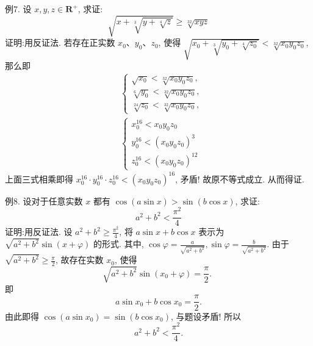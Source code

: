 例7. 设 $x, y, z \in \mathbf{R}^{+}$, 求证:
$$
\sqrt{x+\sqrt[3]{y+\sqrt[4]{z}}} \geqslant \sqrt[32]{x y z}
$$
证明:用反证法.
若存在正实数 $x_0 、 y_0 、 z_0$, 使得 $\sqrt{x_0+\sqrt[3]{y_0+\sqrt[4]{z_0}}}<\sqrt[32]{x_0 y_0 z_0}$, 那么即
$$
\begin{aligned}
& \left\{\begin{array}{l}
\sqrt{x_0}<\sqrt[32]{x_0 y_0 z_0}, \\
\sqrt[6]{y_0}<\sqrt[32]{x_0 y_0 z_0}, \\
\sqrt[24]{z_0}<\sqrt[32]{x_0 y_0 z_0},
\end{array}\right. \\
& \left\{\begin{array}{l}
x_0^{16}<x_0 y_0 z_0 \\
y_0^{16}<\left(x_0 y_0 z_0\right)^3 \\
z_0^{16}<\left(x_0 y_0 z_0\right)^{12}
\end{array}\right.
\end{aligned}
$$
上面三式相乘即得 $x_0^{16} \cdot y_0^{16} \cdot z_0^{16}<\left(x_0 y_0 z_0\right)^{16}$, 矛盾! 故原不等式成立.
从而得证.



例8. 设对于任意实数 $x$ 都有 $\cos (a \sin x)>\sin (b \cos x)$, 求证:
$$
a^2+b^2<\frac{\pi^2}{4}
$$
证明:用反证法.
设 $a^2+b^2 \geqslant \frac{\pi^2}{4}$, 将 $a \sin x+b \cos x$ 表示为 $\sqrt{a^2+b^2} \sin (x+ \varphi)$ 的形式.
其中, $\cos \varphi=\frac{a}{\sqrt{a^2+b^2}}, \sin \varphi=\frac{b}{\sqrt{a^2+b^2}}$.
由于 $\sqrt{a^2+b^2} \geqslant \frac{\pi}{2}$, 故存在实数 $x_0$, 使得
$$
\sqrt{a^2+b^2} \sin \left(x_0+\varphi\right)=\frac{\pi}{2} \text {. }
$$
即
$$
a \sin x_0+b \cos x_0=\frac{\pi}{2} .
$$
由此即得 $\cos \left(a \sin x_0\right)=\sin \left(b \cos x_0\right)$, 与题设矛盾!
所以
$$
a^2+b^2<\frac{\pi^2}{4} .
$$




